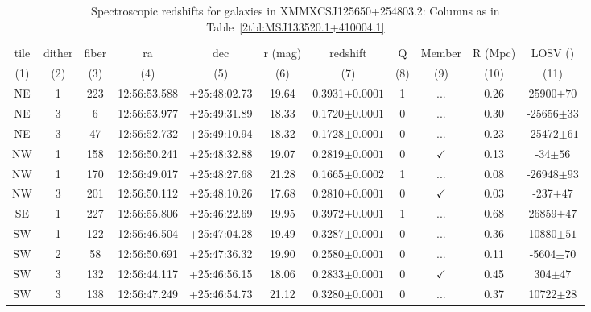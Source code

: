 \begin{landscape}
	\begin{table}
		\centering 
		\caption[Spectroscopic redshifts for galaxies in XMMXCSJ125650+254803.2.]{Spectroscopic redshifts for galaxies in XMMXCSJ125650+254803.2: Columns as in Table~\ref{2tbl:MSJ133520.1+410004.1}}
		\begin{tabular}{ccccccccccc}
			\hline
			tile & dither & fiber & ra & dec & r (mag) & redshift & Q & Member & R (Mpc) & LOSV (\kms) \\
			(1) & (2) & (3) & (4) & (5) & (6) & (7) & (8) & (9) & (10) & (11) \\
			\hline \hline
	NE & 1 & 223 & 12:56:53.588 & +25:48:02.73 & 19.64 & 0.3931$\pm{0.0001}$ & 1 & ... & 0.26 & 25900$\pm{70}$ \\
	NE & 3 & 6 & 12:56:53.977 & +25:49:31.89 & 18.33 & 0.1720$\pm{0.0001}$ & 0 & ... & 0.30 & -25656$\pm{33}$ \\
	NE & 3 & 47 & 12:56:52.732 & +25:49:10.94 & 18.32 & 0.1728$\pm{0.0001}$ & 0 & ... & 0.23 & -25472$\pm{61}$ \\
	NW & 1 & 158 & 12:56:50.241 & +25:48:32.88 & 19.07 & 0.2819$\pm{0.0001}$ & 0 & $\checkmark$ & 0.13 & -34$\pm{56}$ \\
	NW & 1 & 170 & 12:56:49.017 & +25:48:27.68 & 21.28 & 0.1665$\pm{0.0002}$ & 1 & ... & 0.08 & -26948$\pm{93}$ \\
	NW & 3 & 201 & 12:56:50.112 & +25:48:10.26 & 17.68 & 0.2810$\pm{0.0001}$ & 0 & $\checkmark$ & 0.03 & -237$\pm{47}$ \\
	SE & 1 & 227 & 12:56:55.806 & +25:46:22.69 & 19.95 & 0.3972$\pm{0.0001}$ & 1 & ... & 0.68 & 26859$\pm{47}$ \\
	SW & 1 & 122 & 12:56:46.504 & +25:47:04.28 & 19.49 & 0.3287$\pm{0.0001}$ & 0 & ... & 0.36 & 10880$\pm{51}$ \\
	SW & 2 & 58 & 12:56:50.691 & +25:47:36.32 & 19.90 & 0.2580$\pm{0.0001}$ & 0 & ... & 0.11 & -5604$\pm{70}$ \\
	SW & 3 & 132 & 12:56:44.117 & +25:46:56.15 & 18.06 & 0.2833$\pm{0.0001}$ & 0 & $\checkmark$ & 0.45 & 304$\pm{47}$ \\
	SW & 3 & 138 & 12:56:47.249 & +25:46:54.73 & 21.12 & 0.3280$\pm{0.0001}$ & 0 & ... & 0.37 & 10722$\pm{28}$ \\
			\hline
		\end{tabular}
		\label{2tbl:XMMXCSJ125650+254803.2}
	\end{table}
\end{landscape}

